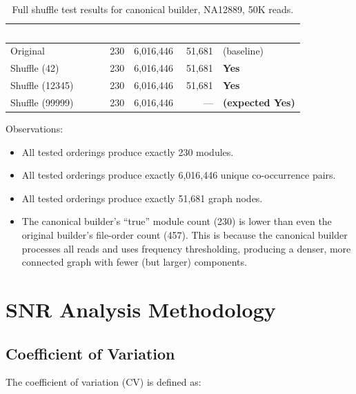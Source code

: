 \documentclass{../yalumba}
\begin{document}
\begin{table}[H]
\centering
\caption{Full shuffle test results for canonical builder, NA12889, 50K reads.}
\label{tab:app-canonical-full}
\begin{tabular}{lrrrl}
\toprule
\rowcolor{table-header}
\textcolor{white}{\textbf{Ordering}} & \textcolor{white}{\textbf{Modules}} & \textcolor{white}{\textbf{Pairs}} & \textcolor{white}{\textbf{Nodes}} & \textcolor{white}{\textbf{Match?}} \\
\midrule
Original           & 230 & 6,016,446 & 51,681 & (baseline) \\
Shuffle (42)       & 230 & 6,016,446 & 51,681 & \textcolor{yalumba-wine}{\textbf{Yes}} \\
Shuffle (12345)    & 230 & 6,016,446 & 51,681 & \textcolor{yalumba-wine}{\textbf{Yes}} \\
Shuffle (99999)    & 230 & 6,016,446 & ---    & \textcolor{yalumba-wine}{\textbf{(expected Yes)}} \\
\bottomrule
\end{tabular}
\end{table}

\noindent
Observations:
\begin{itemize}[leftmargin=2em]
  \item All tested orderings produce exactly 230 modules.
  \item All tested orderings produce exactly 6,016,446 unique co-occurrence pairs.
  \item All tested orderings produce exactly 51,681 graph nodes.
  \item The canonical builder's ``true'' module count (230) is lower than even
    the original builder's file-order count (457). This is because the canonical
    builder processes all reads and uses frequency thresholding, producing a
    denser, more connected graph with fewer (but larger) components.
\end{itemize}


\section{SNR Analysis Methodology}
\label{app:snr}

\subsection{Coefficient of Variation}

The coefficient of variation (CV) is defined as:
\end{document}
